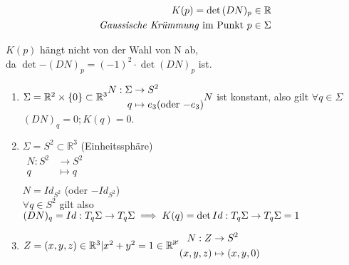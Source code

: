 \documentclass[../main.tex]{subfiles}
\begin{document}
\begin{definition}
    \begin{align*}
        K(p) = \det{(DN)_{p}}\in \mathbb{R}\\
        \text{\emph{Gaussische Krümmung} im Punkt } p \in \Sigma
    \end{align*}
\end{definition}
\begin{remark}
    $K(p)$ hängt nicht von der Wahl von N ab, \\da $\det{-(DN)_{p}} = (-1)^{2} \cdot \det{(DN)_{p}}$ ist.
\end{remark}
\begin{example}
    \begin{enumerate}
        \item $\Sigma = \mathbb{R}^{2} \times \{0\} \subset \mathbb{R}^{3}\\
        \begin{aligned}
            N : \Sigma & \to S^{2}\\
            q & \mapsto e_{3} \text{(oder $-e_{3}$)}\\
        \end{aligned}\\
        N$ ist konstant, also gilt $\forall q \in \Sigma$ 
        $(DN)_{q} = 0; K(q) = 0$.
        \item $\Sigma = S^{2} \subset \mathbb{R}^{3}$ (Einheitssphäre)\\
        $\begin{aligned}
            N: S^{2} &\to S^{2}\\
            q &\mapsto q\\
        \end{aligned}$\\
        $N = Id_{S^{2}}$ (oder $-Id_{S^{2}}$)\\
        $\forall q \in S^{2}$ gilt also $(DN)_{q} = Id : T_{q}\Sigma \to T_{q}\Sigma\\
        \implies K(q) = \det{Id: T_{q}\Sigma \to T_{q}\Sigma} = 1$
        \item $Z = {(x,y,z)\in \mathbb{R}^{3} | x^{2} + y^{2} = 1}\in \mathbb{R^{3}}\\
        \begin{aligned}
            N : Z &\to S^{2}\\
            (x,y,z) &\mapsto (x,y,0)\\
        \end{aligned}$\\

\end{enumerate}
\end{example}
\end{document}
